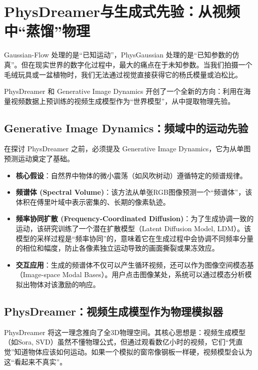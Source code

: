 \chapter{PhysDreamer与生成式先验：从视频中“蒸馏”物理}
\label{cha:physdreamer}

Gaussian-Flow 处理的是“已知运动”，PhysGaussian 处理的是“已知参数的仿真”。但在现实世界的数字化过程中，最大的痛点在于未知参数。当我们拍摄一个毛绒玩具或一盆植物时，我们无法通过视觉直接获得它的杨氏模量或泊松比。

PhysDreamer\cite{li2024physdreamer_arxiv,li2024physdreamer_eccv,li2024physdreamer_researchgate} 和 Generative Image Dynamics\cite{li2024generative_cvpr,li2024generative_pdf,generative_dynamics_homepage} 开创了一个全新的方向：利用在海量视频数据上预训练的视频生成模型作为“世界模型”，从中提取物理先验。

\section{Generative Image Dynamics：频域中的运动先验}
在探讨 PhysDreamer 之前，必须提及 Generative Image Dynamics\cite{li2024generative_cvpr,li2024generative_pdf}，它为从单图预测运动奠定了基础。
\begin{itemize}
    \item \textbf{核心假设}：自然界中物体的微小震荡（如风吹树动）遵循特定的频谱规律。
    \item \textbf{频谱体 (Spectral Volume)}：该方法从单张RGB图像预测一个“频谱体”，该体积在傅里叶域中表示密集的、长期的像素轨迹\cite{li2024generative_pdf,generative_dynamics_homepage}。
    \item \textbf{频率协同扩散 (Frequency-Coordinated Diffusion)}：为了生成协调一致的运动，该研究训练了一个潜在扩散模型（Latent Diffusion Model, LDM）。该模型的采样过程是“频率协同”的，意味着它在生成过程中会协调不同频率分量的相位和幅度，防止各像素独立运动导致的画面撕裂或果冻效应\cite{li2024generative_cvpr}。
    \item \textbf{交互应用}：生成的频谱体不仅可以产生循环视频，还可以作为图像空间模态基（Image-space Modal Bases）。用户点击图像某处，系统可以通过模态分析模拟出物体对该激励的响应\cite{li2024generative_pdf,generative_dynamics_homepage}。
\end{itemize}

\section{PhysDreamer：视频生成模型作为物理模拟器}
PhysDreamer 将这一理念推向了全3D物理空间。其核心思想是：视频生成模型（如Sora, SVD）虽然不懂物理公式，但通过观看数亿小时的视频，它们“凭直觉”知道物体应该如何运动。如果一个模拟的窗帘像钢板一样硬，视频模型会认为这“看起来不真实”。

